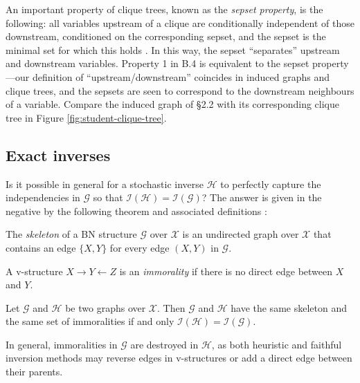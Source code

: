\documentclass{article}
\begin{document}
An important property of clique trees, known as the \emph{sepset property}, is the following: all variables upstream of a clique are conditionally independent of those downstream, conditioned on the corresponding sepset, and the sepset is the minimal set for which this holds \citep[Theorem 10.2]{KollerFriedman2009}.
In this way, the sepset ``separates'' upstream and downstream variables.
Property 1 in B.4 is equivalent to the sepset property---our definition of ``upstream/downstream'' coincides in induced graphs and clique trees, and the sepsets are seen to correspond to the downstream neighbours of a variable.
Compare the induced graph of \S2.2 with its corresponding clique tree in Figure \ref{fig:student-clique-tree}.

\subsection{Exact inverses}
Is it possible in general for a stochastic inverse $\mathcal{H}$ to perfectly capture the independencies in $\mathcal{G}$ so that $\mathcal{I}(\mathcal{H})=\mathcal{I}(\mathcal{G})$? The answer is given in the negative by the following theorem and associated definitions \citep[Theorem 3.8]{KollerFriedman2009}:
\begin{definition}
	The \emph{skeleton} of a BN structure $\mathcal{G}$ over $\mathcal{X}$ is an undirected graph over $\mathcal{X}$ that contains an edge $\{X,Y\}$ for every edge $(X,Y)$ in $\mathcal{G}$.
\end{definition}
\begin{definition}
	A v-structure $X\rightarrow Y\leftarrow Z$ is an \emph{immorality} if there is no direct edge between $X$ and $Y$.
\end{definition}
\begin{theorem}
	Let $\mathcal{G}$ and $\mathcal{H}$ be two graphs over $\mathcal{X}$.
Then $\mathcal{G}$ and $\mathcal{H}$ have the same skeleton and the same set of immoralities if and only $\mathcal{I}(\mathcal{H})=\mathcal{I}(\mathcal{G})$.
\end{theorem}
In general, immoralities in $\mathcal{G}$ are destroyed in $\mathcal{H}$, as both heuristic and faithful inversion methods may reverse edges in v-structures or add a direct edge between their parents.
\end{document}
